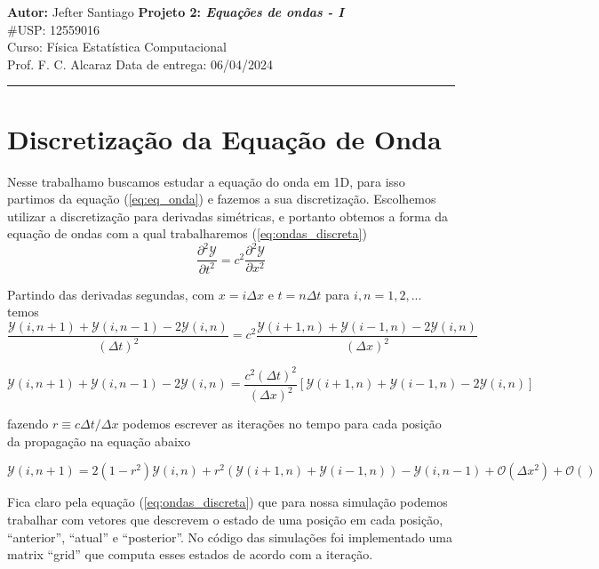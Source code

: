 \documentclass[a4paper, 11pt]{article}
\begin{document}
\noindent
\large\textbf{Autor:} Jefter Santiago \hfill \textbf{Projeto 2: {\color{blue}\emph{Equações de ondas - I}}}   \\
\#USP: 12559016 \\
\normalsize Curso: Física Estatística Computacional \\
Prof. F. C. Alcaraz \hfill Data de entrega: 06/04/2024\\
\noindent\rule{7in}{2.8pt}



\section{Discretização da Equação de Onda}
Nesse trabalhamo buscamos estudar a equação do onda em 1D, para isso partimos da equação
(\ref{eq:eq_onda}) e fazemos a sua discretização. Escolhemos utilizar a discretização para derivadas
simétricas, e portanto obtemos a forma da equação de ondas com a qual trabalharemos (\ref{eq:ondas_discreta})
\begin{equation}
  \frac{\partial^2 \mathcal{Y}}{\partial t^2} = c^2  \frac{\partial^2 \mathcal{Y}}{\partial x^2}
  \label{eq:eq_onda}
\end{equation}

Partindo das derivadas segundas, com \( x = i \Delta x \) e \( t = n \Delta t \) para \( i, n = 1, 2, ... \)  temos
\[  \frac{\mathcal{Y}(i, n+1) + \mathcal{Y}(i,n-1) - 2 \mathcal{Y}(i,n)}{(\Delta t)^2} = c^2 \frac{\mathcal{Y}(i+1,n) + \mathcal{Y}(i-1,n) -
    2\mathcal{Y}(i,n)}{(\Delta x)^2} \]

\[ \mathcal{Y}(i, n+1) + \mathcal{Y}(i,n-1) - 2 \mathcal{Y}(i,n) = \frac{c^2 (\Delta t)^2}{(\Delta x)^2} \left[ \mathcal{Y}(i+1, n) + \mathcal{Y}(i-1,n) - 2\mathcal{Y}(i,n) \right]  \]

fazendo  \( r \equiv  c \Delta t/\Delta x\) podemos escrever as iterações no tempo para cada posição da propagação
na equação abaixo

\begin{equation}
  \mathcal{Y}(i, n+1) = 2 \left( 1 - r^2 \right) \mathcal{Y}(i, n) + r^2 \left( \mathcal{Y}(i+1,n) + \mathcal{Y}(i-1,n) \right) - \mathcal{Y}(i,n-1)
  + \mathcal{O}(\Delta x^2) + \mathcal{O}()
  \label{eq:ondas_discreta}
\end{equation}


Fica claro pela equação (\ref{eq:ondas_discreta}) que para nossa simulação podemos trabalhar com 
vetores que descrevem o estado de uma posição em cada posição, ``anterior'', ``atual'' e
``posterior''. No código das simulações foi implementado uma matrix ``grid'' que computa esses
estados de acordo com a iteração.  
\end{document}
